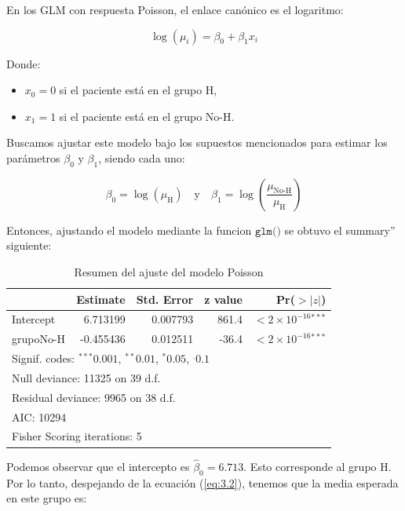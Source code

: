 En los GLM con respuesta Poisson, el enlace canónico es el logaritmo:

\begin{equation}
    \log(\mu_i) = \beta_0 + \beta_1 x_i
    \label{eq:3.1}
\end{equation}

Donde:

\begin{itemize}
    \item $x_0 = 0$ si el paciente está en el grupo H,
    \item $x_1 = 1$ si el paciente está en el grupo No-H.
\end{itemize}

Buscamos ajustar este modelo bajo los supuestos mencionados para estimar los parámetros $\beta_0$ y $\beta_1$, siendo cada uno: 

\begin{equation}
    \beta_0 = \log(\mu_\text{H})\quad \text{y} \quad \beta_1 = \log\left(\frac{\mu_{\text{No-H}}}{\mu_\text{H}}\right)
    \label{eq:3.2}
\end{equation}

Entonces, ajustando el modelo mediante la funcion $\texttt{glm()}$ se obtuvo el summary'' siguiente:

\begin{table}[H]
\centering
\caption{Resumen del ajuste del modelo Poisson}
\begin{tabular}{lrrrr}
\hline
 & Estimate & Std. Error & z value & Pr($>|z|$) \\
\hline
Intercept  & 6.713199 & 0.007793 & 861.4 & $<2\times 10^{-16}$$^{***}$ \\
grupoNo-H  & -0.455436 & 0.012511 & -36.4 & $<2\times 10^{-16}$$^{***}$ \\
\hline
\multicolumn{5}{l}{\footnotesize Signif. codes: $^{***}0.001$, $^{**}0.01$, $^{*}0.05$, $^{.}0.1$} \\
\multicolumn{5}{l}{\footnotesize Null deviance: 11325 on 39 d.f.} \\
\multicolumn{5}{l}{\footnotesize Residual deviance: 9965 on 38 d.f.} \\
\multicolumn{5}{l}{\footnotesize AIC: 10294} \\
\multicolumn{5}{l}{\footnotesize Fisher Scoring iterations: 5} \\
\end{tabular}
\end{table}

Podemos observar que el intercepto es $\widehat{\beta}_0 = 6.713$. Esto corresponde al grupo H. Por lo tanto, despejando de la ecuación (\ref{eq:3.2}), tenemos que la media esperada en este grupo es:

